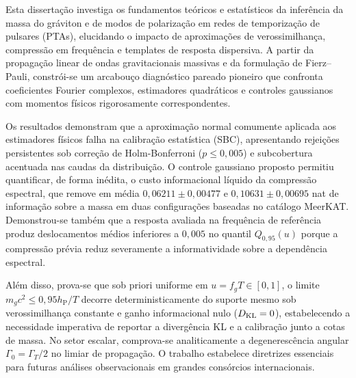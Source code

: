 Esta dissertação investiga os fundamentos teóricos e estatísticos da inferência da massa do gráviton e de modos de polarização em redes de temporização de pulsares (PTAs), elucidando o impacto de aproximações de verossimilhança, compressão em frequência e templates de resposta dispersiva. A partir da propagação linear de ondas gravitacionais massivas e da formulação de Fierz--Pauli, constrói-se um arcabouço diagnóstico pareado pioneiro que confronta coeficientes Fourier complexos, estimadores quadráticos e controles gaussianos com momentos físicos rigorosamente correspondentes.

Os resultados demonstram que a aproximação normal comumente aplicada aos estimadores físicos falha na calibração estatística (SBC), apresentando rejeições persistentes sob correção de Holm-Bonferroni ($p \le 0{,}005$) e subcobertura acentuada nas caudas da distribuição. O controle gaussiano proposto permitiu quantificar, de forma inédita, o custo informacional líquido da compressão espectral, que remove em média $0{,}06211 \pm 0{,}00477$ e $0{,}10631 \pm 0{,}00695$ nat de informação sobre a massa em duas configurações baseadas no catálogo MeerKAT. Demonstrou-se também que a resposta avaliada na frequência de referência produz deslocamentos médios inferiores a $0{,}005$ no quantil $Q_{0{,}95}(u)$ porque a compressão prévia reduz severamente a informatividade sobre a dependência espectral.

Além disso, prova-se que sob priori uniforme em $u = f_g T \in [0,1]$, o limite $m_g c^2 \le 0{,}95 h_{\mathrm P}/T$ decorre deterministicamente do suporte mesmo sob verossimilhança constante e ganho informacional nulo ($D_{\rm KL} = 0$), estabelecendo a necessidade imperativa de reportar a divergência KL e a calibração junto a cotas de massa. No setor escalar, comprova-se analiticamente a degenerescência angular $\Gamma_0 = \Gamma_T/2$ no limiar de propagação. O trabalho estabelece diretrizes essenciais para futuras análises observacionais em grandes consórcios internacionais.
